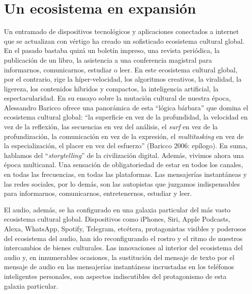 \documentclass[
]{interact}
\begin{document}
\section{Un ecosistema en
expansión}\label{un-ecosistema-en-expansiuxf3n}

Un entramado de dispositivos tecnológicos y aplicaciones conectados a
internet que se actualizan con vértigo ha creado un sofisticado
ecosistema cultural global. En el pasado bastaba quizá un boletín
impreso, una revista periódica, la publicación de un libro, la
asistencia a una conferencia magistral para informarnos, comunicarnos,
estudiar o leer. En este ecosistema cultural global, por el contrario,
rige la híper-velocidad, los algoritmos creativos, la viralidad, la
ligereza, los contenidos híbridos y compactos, la inteligencia
artificial, la espectacularidad. En su ensayo sobre la mutación cultural
de nuestra época, Alessandro Baricco ofrece una panorámica de esta
``lógica bárbara'' que domina el ecosistema cultural global: ``la
superficie en vez de la profundidad, la velocidad en vez de la
reflexión, las secuencias en vez del análisis, el \emph{surf} en vez de
la profundización, la comunicación en vez de la expresión, el
\emph{multitasking} en vez de la especialización, el placer en vez del
esfuerzo'' (Baricco 2006: epílogo). En suma, hablamos del
``\emph{storytelling}'' de la civilización digital. Además, vivimos
ahora una época multicanal. Una sensación de obligatoriedad de estar en
todos los canales, en todas las frecuencias, en todas las plataformas.
Las mensajerías instantáneas y las redes sociales, por lo demás, son las
autopistas que juzgamos indispensables para informarnos, comunicarnos,
entretenernos, estudiar y leer.

El audio, además, se ha configurado en una galaxia particular del más
vasto ecosistema cultural global. Dispositivos como iPhones, Siri, Apple
Podcasts, Alexa, WhatsApp, Spotify, Telegram, etcétera, protagonistas
visibles y poderosos del ecosistema del audio, han ido reconfigurando el
rostro y el ritmo de nuestros intercambios de bienes culturales. Las
innovaciones al interior del ecosistema del audio y, en innumerables
ocasiones, la sustitución del mensaje de texto por el mensaje de audio
en las mensajerías instantáneas incrustadas en los teléfonos
inteligentes personales, son aspectos indiscutibles del protagonismo de
esta galaxia particular.
\end{document}
